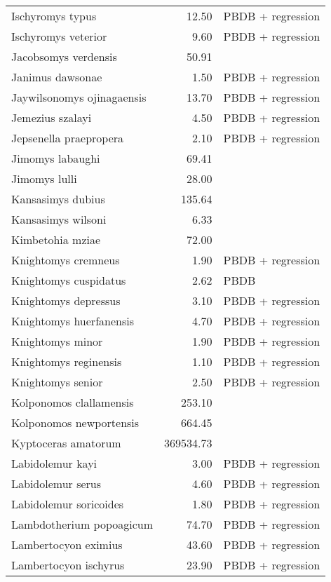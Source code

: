 \begin{table}[ht]
\begin{tabular}{lrl}
  Ischyromys typus & 12.50 & PBDB + regression \\ 
  Ischyromys veterior & 9.60 & PBDB + regression \\ 
  Jacobsomys verdensis & 50.91 & \cite{Tomiya2013} \\ 
  Janimus dawsonae & 1.50 & PBDB + regression \\ 
  Jaywilsonomys ojinagaensis & 13.70 & PBDB + regression \\ 
  Jemezius szalayi & 4.50 & PBDB + regression \\ 
  Jepsenella praepropera & 2.10 & PBDB + regression \\ 
  Jimomys labaughi & 69.41 & \cite{Tomiya2013} \\ 
  Jimomys lulli & 28.00 & \cite{McKenna2011} \\ 
  Kansasimys dubius & 135.64 & \cite{Tomiya2013} \\ 
  Kansasimys wilsoni & 6.33 & \cite{Matthew1901} \\ 
  Kimbetohia mziae & 72.00 & \cite{Wilson2012} \\ 
  Knightomys cremneus & 1.90 & PBDB + regression \\ 
  Knightomys cuspidatus & 2.62 & PBDB \\ 
  Knightomys depressus & 3.10 & PBDB + regression \\ 
  Knightomys huerfanensis & 4.70 & PBDB + regression \\ 
  Knightomys minor & 1.90 & PBDB + regression \\ 
  Knightomys reginensis & 1.10 & PBDB + regression \\ 
  Knightomys senior & 2.50 & PBDB + regression \\ 
  Kolponomos clallamensis & 253.10 & \cite{Tseng2009} \\ 
  Kolponomos newportensis & 664.45 & \cite{Scott2013} \\ 
  Kyptoceras amatorum & 369534.73 & \cite{Tomiya2013} \\ 
  Labidolemur kayi & 3.00 & PBDB + regression \\ 
  Labidolemur serus & 4.60 & PBDB + regression \\ 
  Labidolemur soricoides & 1.80 & PBDB + regression \\ 
  Lambdotherium popoagicum & 74.70 & PBDB + regression \\ 
  Lambertocyon eximius & 43.60 & PBDB + regression \\ 
  Lambertocyon ischyrus & 23.90 & PBDB + regression \\ 

\end{tabular}
\end{table}
